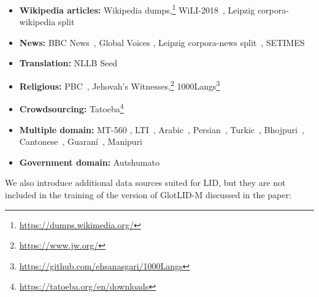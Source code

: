 \documentclass[11pt]{article}
\def\modelname{\mbox{GlotLID-M}\xspace}
\begin{document}
\begin{itemize}[noitemsep]
    \item \textbf{Wikipedia articles:} Wikipedia dumps,\footnote{\url{https://dumps.wikimedia.org/}} WiLI-2018~\citep{thoma2018wili}, Leipzig corpora-wikipedia split~\citep{goldhahn-etal-2012-building}
    \item \textbf{News:} BBC News~\citep{hasan-etal-2021-xl}, Global Voices \citep{tiedemann-2012-parallel}, Leipzig corpora-news split~\citep{goldhahn-etal-2012-building}, SETIMES~\citep{tiedemann-2012-parallel}
    \item \textbf{Translation:} NLLB Seed~\citep{nllbteam2022language}
    \item \textbf{Religious:} PBC~\citep{mayer-cysouw-2014-creating}, Jehovah's Witnesses,\footnote{\url{https://www.jw.org/}} 1000Langs\footnote{\url{https://github.com/ehsanasgari/1000Langs}}
    \item \textbf{Crowdsourcing:} Tatoeba\footnote{\url{https://tatoeba.org/en/downloads}}
    \item \textbf{Multiple domain:}  MT-560 \citep{gowda-etal-2021-many,tiedemann-2012-parallel, burchell-etal-2023-open, post-etal-2012-constructing,ziemski-etal-2016-united,rozis-skadins-2017-tilde,kunchukuttan-etal-2018-iit,qi-etal-2018-pre,zhang-etal-2020-improving,bojar-etal-2013-findings,bojar-etal-2014-findings,bojar-etal-2015-findings,bojar-etal-2016-findings,bojar-etal-2017-findings,bojar-etal-2018-findings,barrault-etal-2019-findings,barrault-etal-2020-findings}, LTI~\citep{brown2012finding}, Arabic~\citep{zahir2022iadd,alsarsour-etal-2018-dart,abu-kwaik-etal-2018-shami,medhaffar-etal-2017-sentiment,meftouh-etal-2015-machine,zaidan-callison-burch-2011-arabic, el-haj-etal-2018-arabic, bouamor-etal-2019-madar},  Persian~\citep{pilevar2011tep, kashefi2018mizan}, Turkic~\citep{mirzakhalov-etal-2021-large}, Bhojpuri~\citep{ojha2019english}, Cantonese~\citep{luke2015hong}, Guaran{\'i}~\citep{gongora-etal-2022-use}, Manipuri~\citep{huidrom-etal-2021-em}
    \item \textbf{Government domain:} Autshumato~\citep{groenewald2010processing}
\end{itemize}

We also introduce additional data sources suited for LID, but they are not included in the training of the version of \modelname discussed in the paper:
\end{document}
